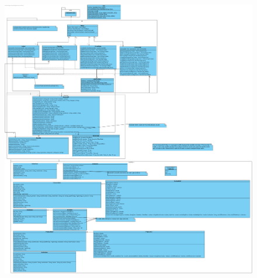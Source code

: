\newpage
\begin{figure}[h]
\centering
\includegraphics[width = 1.1\textwidth]{Base/classDiagram/img/classDiagram.png}
\end{figure}